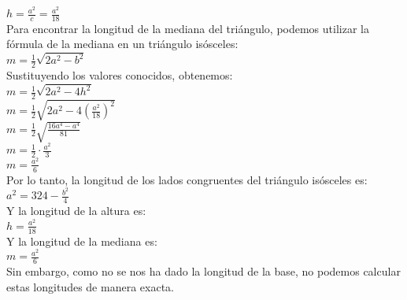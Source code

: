 \documentclass{article}
\begin{document}
$h = \frac{a^2}{c} = \frac{a^2}{18}$\\
Para encontrar la longitud de la mediana del triángulo, podemos utilizar la fórmula de la mediana en un triángulo isósceles:\\
$m = \frac{1}{2} \sqrt{2a^2 - b^2}$\\
Sustituyendo los valores conocidos, obtenemos:\\
$m = \frac{1}{2} \sqrt{2a^2 - 4h^2}$\\
$m = \frac{1}{2} \sqrt{2a^2 - 4\left(\frac{a^2}{18}\right)^2}$\\
$m = \frac{1}{2} \sqrt{\frac{16a^4 - a^4}{81}}$\\
$m = \frac{1}{2} \cdot \frac{a^2}{3}$\\
$m = \frac{a^2}{6}$\\
Por lo tanto, la longitud de los lados congruentes del triángulo isósceles es:\\
$a^2 = 324 - \frac{b^2}{4}$\\
Y la longitud de la altura es:\\
$h = \frac{a^2}{18}$\\
Y la longitud de la mediana es:\\
$m = \frac{a^2}{6}$\\
Sin embargo, como no se nos ha dado la longitud de la base, no podemos calcular estas longitudes de manera exacta.\\
\end{document}
